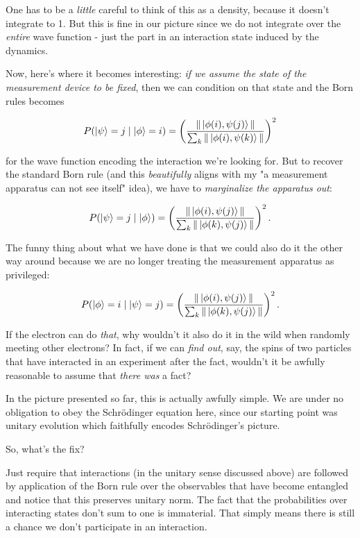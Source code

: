 \documentclass{article}
\begin{document}
One has to be a \textit{little} careful to think of this as a density, because it doesn't integrate to 1. But this is fine in our picture since we do not integrate over the \textit{entire} wave function - just the part in an interaction state induced by the dynamics.

Now, here's where it becomes interesting: \textit{if we assume the state of the measurement device to be fixed}, then we can condition on that state and the Born rules becomes

\begin{align*}
P(\ket{\psi}=j\mid \ket{\phi}=i) = \left(\frac{\|\ket{\phi(i), \psi(j)}\|}{\sum_k \|\ket{\phi(i), \psi(k)}\|}\right)^2
\end{align*}

for the wave function encoding the interaction we're looking for. But to recover the standard Born rule (and this \textit{beautifully} aligns with my "a measurement apparatus can not see itself" idea), we have to \textit{marginalize the apparatus out}:

\begin{align*}
P(\ket{\psi}=j\mid \ket{\phi}) = \left(\frac{\|\ket{\phi(i), \psi(j)}\|}{\sum_k \|\ket{\phi(k), \psi(j)}\|}\right)^2.
\end{align*}

The funny thing about what we have done is that we could also do it the other way around because we are no longer treating the measurement apparatus as privileged:

\begin{align*}
P(\ket{\phi}=i\mid \ket{\psi}=j) = \left(\frac{\|\ket{\phi(i), \psi(j)}\|}{\sum_k \|\ket{\phi(k), \psi(j)}\|}\right)^2.
\end{align*}

If the electron can do \textit{that}, why wouldn't it also do it in the wild when randomly meeting other electrons? In fact, if we can \textit{find out}, say, the spins of two particles that have interacted in an experiment after the fact, wouldn't it be awfully reasonable to assume that \textit{there was} a fact?

In the picture presented so far, this is actually awfully simple. We are under no obligation to obey the Schrödinger equation here, since our starting point was unitary evolution which faithfully encodes Schrödinger's picture.

So, what's the fix?

Just require that interactions (in the unitary sense discussed above) are followed by application of the Born rule over the observables that have become entangled and notice that this preserves unitary norm. The fact that the probabilities over interacting states don't sum to one is immaterial. That simply means there is still a chance we don't participate in an interaction.
\end{document}
